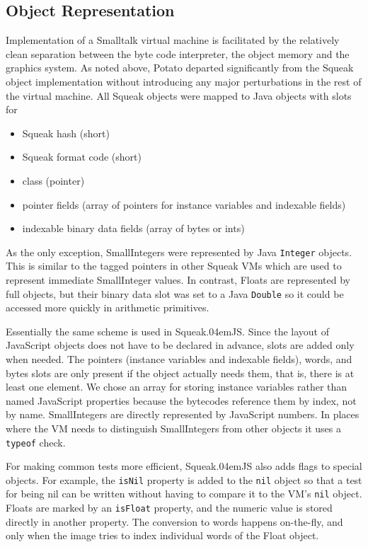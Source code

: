 \documentclass[natbib]{sigplanconf}
\newcommand*\SqueakJS{Squeak\texorpdfstring{\kern.04em}{}JS\xspace}
\newcommand*\JS{JavaScript\xspace}
\begin{document}
\subsection{Object Representation}
\label{sec:objrep}

Implementation of a Smalltalk virtual machine is facilitated by the
relatively clean separation between the byte code interpreter, the
object memory and the graphics system. As noted above, Potato departed
significantly from the Squeak object implementation without
introducing any major perturbations in the rest of the virtual
machine. All Squeak objects were mapped to Java objects with slots for

\begin{itemize}
\item Squeak hash (short)
\item Squeak format code (short)
\item class (pointer)
\item pointer fields (array of pointers for instance variables and indexable fields)
\item indexable binary data fields (array of bytes or ints)
\end{itemize}

As the only exception, SmallIntegers were represented by Java
\lstinline|Integer| objects. This is similar to the tagged pointers in
other Squeak \acp{VM} which are used to represent immediate SmallInteger
values. In contrast, Floats are represented by full objects, but their
binary data slot was set to a Java \lstinline|Double| so it could be
accessed more quickly in arithmetic primitives.

Essentially the same scheme is used in \SqueakJS. Since the layout of \JS
objects does not have to be declared in advance, slots are added only when
needed. The pointers (instance variables and indexable fields), words, and
bytes slots are only present if the object actually needs them, that is, there
is at least one element. We chose an array for storing instance variables
rather than named \JS properties because the bytecodes reference them by
index, not by name. SmallIntegers are directly represented by \JS numbers. In
places where the \ac{VM} needs to distinguish SmallIntegers from other objects it
uses a \lstinline|typeof| check.

For making common tests more efficient, \SqueakJS also adds flags to special
objects. For example, the \lstinline|isNil| property is added to the
\lstinline|nil| object so that a test for being nil can be written without
having to compare it to the \ac{VM}'s \lstinline|nil| object. Floats are marked by
an \lstinline|isFloat| property, and the numeric value is stored directly in
another property. The conversion to words happens on-the-fly, and only when
the image tries to index individual words of the Float object.
\end{document}
